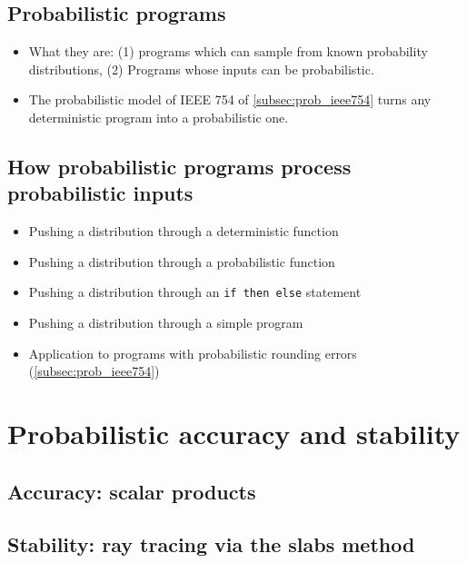 \documentclass[10pt,conference]{IEEEtran}
\begin{document}
\subsection{Probabilistic programs}
\begin{itemize}
\item What they are: (1) programs which can sample from known probability distributions, (2) Programs whose inputs can be probabilistic.
\item The probabilistic model of IEEE 754 of \cref{subsec:prob_ieee754} turns any deterministic program into a probabilistic one.
\end{itemize}

\subsection{How probabilistic programs process probabilistic inputs}
\begin{itemize}
\item Pushing a distribution through a deterministic function
\item Pushing a distribution through a probabilistic function
\item Pushing a distribution through an \texttt{if then else} statement
\item Pushing a distribution through a simple program
\item Application to programs with probabilistic rounding errors (\cref{subsec:prob_ieee754})
\end{itemize}

\section{Probabilistic accuracy and stability}

\subsection{Accuracy: scalar products}

\subsection{Stability: ray tracing via the slabs method}
\end{document}
